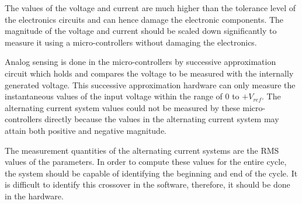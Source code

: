 The values of the voltage and current are much higher than the tolerance level of the electronics circuits and can hence damage the electronic components. The magnitude of the voltage and current should be scaled down significantly to measure it using a micro-controllers without damaging the electronics.

Analog sensing is done in the micro-controllers by successive approximation circuit which holds and compares the voltage to be measured with the internally generated voltage. This successive approximation hardware can only measure the instantaneous values of the input voltage within the range of $0$ to $+V_{ref}$. The alternating current system values could not be measured by these micro-controllers directly because the values in the alternating current system may attain both positive and negative magnitude.

The measurement quantities of the alternating current systems are the RMS values of the parameters. In order to compute these values for the entire cycle, the system should be capable of identifying the beginning and end of the cycle. It is difficult to identify this crossover in the software, therefore, it should be done in the hardware.

